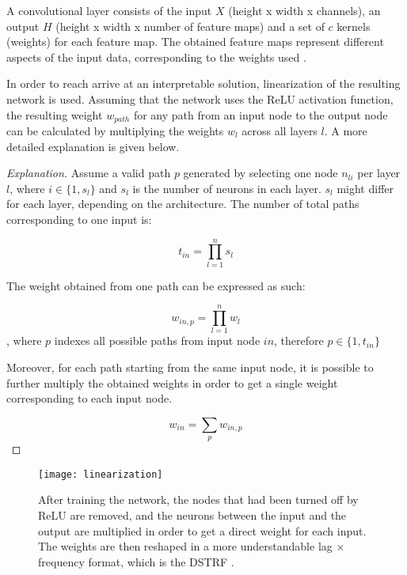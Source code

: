 A convolutional layer consists of the input $X$ (height x width x channels), an output $H$ (height x width x number of feature maps) and a  set of $c$ kernels (weights) for each feature map. The obtained feature maps represent different aspects of the input data, corresponding to the weights used \parencite{liSurveyConvolutionalNeural2022}.


In order to reach arrive at an interpretable solution, linearization of the resulting network is used. Assuming that the network uses the ReLU activation function, the resulting weight $w_{path}$ for any path from an input node to the output node can be calculated by multiplying the weights $w_l$ across all layers $l$. A more detailed explanation is given below.

\begin{proof}[Explanation]
Assume a valid path $p$ generated by selecting one node $n_{li}$ per layer $l$, where $i \in \{1, s_l\}$ and $s_l$ is the number of neurons in each layer. $s_l$ might differ for each layer, depending on the architecture. The number of total paths corresponding to one input is:

\begin{equation}
	t_{in} = \prod_{l=1}^n s_l
\end{equation} 

The weight obtained from one path can be expressed as such:

\begin{equation}
	w_{in, p} = \prod_{l=1}^{n} w_{l}
\end{equation}
, where $p$ indexes all possible paths from input node $in$, therefore $p \in \{1, t_{in}\}$

Moreover, for each path starting from the same input node, it is possible to further multiply the obtained weights in order to get a single weight corresponding to each input node.

\begin{equation}
	w_{in} = \sum_p w_{in, p}
\end{equation}

\end{proof}

\begin{figure}[ht]
	\centering
	\texttt{[image: linearization]}
	\caption{After training the network, the nodes that had been turned off by ReLU are removed, and the neurons between the input and the output are multiplied in order to get a direct weight for each input. The weights are then reshaped in a more understandable lag $\times$ frequency format, which is the DSTRF \parencite{keshishianEstimatingInterpretingNonlinear2020}.}
\end{figure}

